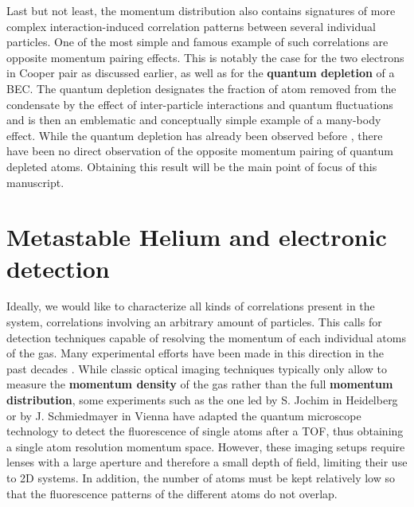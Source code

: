 Last but not least, the momentum distribution also contains signatures of more complex interaction-induced correlation patterns between several individual particles. One of the most simple and famous example of such correlations are opposite momentum pairing effects. This is notably the case for the two electrons in Cooper pair as discussed earlier, as well as for the \textbf{quantum depletion} of a BEC. The quantum depletion designates the fraction of atom removed from the condensate by the effect of inter-particle interactions and quantum fluctuations and is then an emblematic and conceptually simple example of a many-body effect. While the quantum depletion has already been observed before \cite{chang2016,lopes2017,xu2006}, there have been no direct observation of the opposite momentum pairing of quantum depleted atoms. Obtaining this result will be the main point of focus of this manuscript.

\section*{Metastable Helium and electronic detection}

Ideally, we would like to characterize all kinds of correlations present in the system, \ie correlations involving an arbitrary amount of particles. This calls for detection techniques capable of resolving the momentum of each individual atoms of the gas. Many experimental efforts have been made in this direction in the past decades \cite{ott2016single}. While classic optical imaging techniques typically only allow to measure the \textbf{momentum density} of the gas rather than the full \textbf{momentum distribution}, some experiments such as the one led by S. Jochim in Heidelberg \cite{serwane2011deterministic} or by J. Schmiedmayer in Vienna \cite{bucker2009single} have adapted the quantum microscope technology to detect the fluorescence of single atoms after a TOF, thus obtaining a single atom resolution momentum space. However, these imaging setups require lenses with a large aperture and therefore a small depth of field, limiting their use to 2D systems. In addition, the number of atoms must be kept relatively low so that the fluorescence patterns of the different atoms do not overlap.

